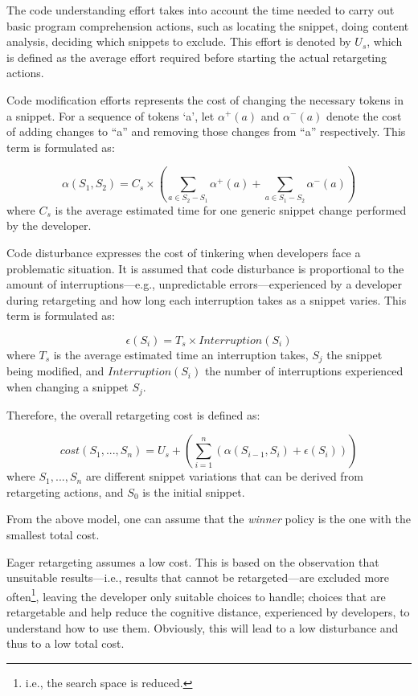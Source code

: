 The code understanding effort takes into account the time needed to carry out basic program comprehension actions, such as locating the snippet, doing content analysis, deciding which snippets to exclude. This effort is denoted by $U_{s}$, which is defined as the average effort required before starting the actual retargeting actions.

Code modification efforts represents the cost of changing the necessary tokens in a snippet. For a sequence of tokens `a', let $\alpha^{+}(a)$ and $\alpha^{-}(a)$ denote the cost of adding changes to ``a'' and removing those changes from ``a'' respectively. This term is formulated as: 

\begin{equation}
	\alpha(S_{1}, S_{2}) = C_{s} \times (\sum_{a \in S_2 - S_1}\alpha^{+}(a) + \sum_{a \in S_1 - S_2}\alpha^{-}(a))
	\label{costmodification}
\end{equation} where $C_{s}$ is the average estimated time for one generic snippet change performed by the developer.

Code disturbance expresses the cost of tinkering\cite{Jadud:2006ir} when developers face a problematic situation. It is assumed that code disturbance is proportional to the amount of interruptions---e.g., unpredictable errors---experienced by a developer during retargeting and how long each interruption takes as a snippet varies. This term is formulated as:

\begin{equation}
	\epsilon(S_{i}) = T_{s} \times Interruption(S_i)
	\label{costmodification}
\end{equation} where $T_{s}$ is the average estimated time an interruption takes, $S_j$ the snippet being modified, and $Interruption(S_i)$ the number of interruptions experienced when changing a snippet $S_j$. 

Therefore, the overall retargeting cost is defined as:

\begin{equation}
	cost(S_1, ..., S_n) = U_s + (\sum_{i=1}^{n}(\alpha(S_{i-1}, S_{i}) + \epsilon(S_{i})))
	\label{totalWork}
\end{equation} where $S_1, ..., S_n$ are different snippet variations that can be derived from retargeting actions, and $S_0$ is the initial snippet.   

From the above model, one can assume that the \emph{winner} policy is the one with the smallest total cost.

Eager retargeting assumes a low cost. This is based on the observation that unsuitable results---i.e., results that cannot be retargeted---are excluded more often\footnote{i.e., the search space is reduced.}, leaving the developer only suitable choices to handle; choices that are retargetable and help reduce the cognitive distance\cite{Krueger:1992wf}, experienced by developers, to understand how to use them. Obviously, this will lead to a low disturbance and thus to a low total cost.  

